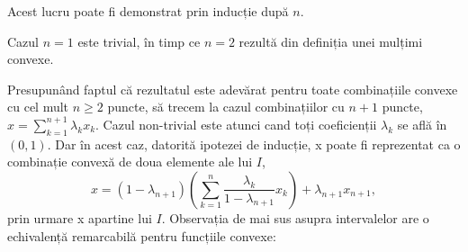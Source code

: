 \documentclass[a4paper,12pt,oneside]{report}
\begin{document}
 Acest lucru poate fi demonstrat prin inducție după \(n\).

 Cazul \(n=1\) este trivial, în timp ce \(n = 2\) rezultă din definiția unei mulțimi convexe.

  Presupunând faptul că rezultatul este adevărat pentru toate combinațiile convexe cu cel mult \(n\geq 2\) puncte, să trecem la cazul combinațiilor cu \(n + 1\) puncte, \(x = \sum_{k = 1}^{n + 1} \lambda _{k}x_{k}\). Cazul non-trivial este atunci cand toți coeficienții \(\lambda _{k}\) se află în \(\left ( 0 , 1 \right )\). Dar în acest caz, datorită ipotezei de inducție, x poate fi reprezentat ca o combinație convexă de doua elemente ale lui \(I\),
\begin{displaymath}
  x = \left ( 1 - \lambda _{n + 1} \right )\left ( \sum_{k = 1}^{n} \frac{\lambda _{k}}{1 - \lambda _{n + 1}} x_{k}\right ) + \lambda _{n + 1}x_{n + 1},
\end{displaymath}
prin urmare x apartine lui \(I\).
	Observația de mai sus asupra intervalelor are o echivalență remarcabilă pentru funcțiile convexe:
\end{document}
